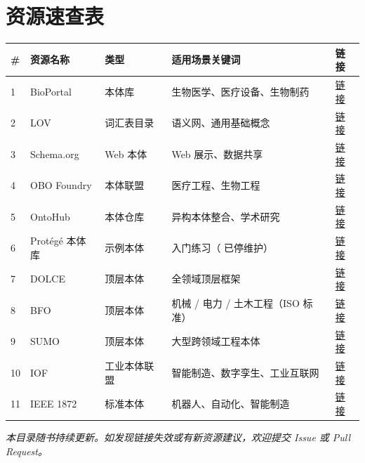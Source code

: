 \section{资源速查表}

\begin{center}
\begin{tabularx}{\linewidth}{@{}lllXX@{}}
\toprule
\textbf{\#} & \textbf{资源名称} & \textbf{类型} & \textbf{适用场景关键词} & \textbf{链接} \\
\midrule
1 & BioPortal & 本体库 & 生物医学、医疗设备、生物制药 & \href{https://bioportal.bioontology.org/}{链接} \\
2 & LOV & 词汇表目录 & 语义网、通用基础概念 & \href{https://lov.linkeddata.es/}{链接} \\
3 & Schema.org & Web 本体 & Web 展示、数据共享 & \href{https://schema.org/}{链接} \\
4 & OBO Foundry & 本体联盟 & 医疗工程、生物工程 & \href{https://obofoundry.org/}{链接} \\
5 & OntoHub & 本体仓库 & 异构本体整合、学术研究 & \href{https://www.ontohub.org/}{链接} \\
6 & Protégé 本体库 & 示例本体 & 入门练习（ 已停维护） & \href{https://protege.stanford.edu/ontologies/}{链接} \\
7 & DOLCE & 顶层本体 & 全领域顶层框架 & \href{https://www.loa.istc.cnr.it/index.php/dolce/}{链接} \\
8 & BFO & 顶层本体 & 机械 / 电力 / 土木工程（ISO 标准） & \href{https://basic-formal-ontology.org/}{链接} \\
9 & SUMO & 顶层本体 & 大型跨领域工程本体 & \href{http://www.ontologyportal.org/}{链接} \\
10 & IOF & 工业本体联盟 & 智能制造、数字孪生、工业互联网 & \href{https://www.industrialontologies.org/}{链接} \\
11 & IEEE 1872 & 标准本体 & 机器人、自动化、智能制造 & \href{https://opensource.ieee.org/aur/owl}{链接} \\
\bottomrule
\end{tabularx}
\end{center}
\color{black}


\textit{本目录随书持续更新。如发现链接失效或有新资源建议，欢迎提交 Issue 或 Pull Request。}

